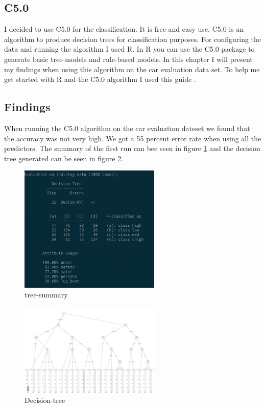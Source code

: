 \documentclass[a4paper, 12pt]{article}
\begin{document}
\subsection{C5.0}
I decided to use C5.0 for the classification. It is free and easy use. C5.0 is an algorithm to produce decision trees for classification purposes. For configuring the data and running the algorithm I used R. In R you can use the C5.0 package to generate basic tree-models and rule-based models. In this chapter I will present my findings when using this algorithm on the car evaluation data set. To help me get started with R and the C5.0 algorithm I used this guide \cite{guide}.

\subsection{Findings}
When running the C5.0 algorithm on the car evaluation dateset we found that the accuracy was not very high. We got a 55 percent error rate when using all the predictors. The summary of the first run can bee seen in figure \ref{fig:tree-summary} and the decision tree generated can be seen in figure \ref{fig:decition-tree}.
  \begin{figure}[h]
    \centering 
    \includegraphics[width=0.6\textwidth]
    {images/summary}
    \caption{tree-summary}
    \label{fig:tree-summary}
  \end{figure}

  \begin{figure}[h]
    \centering 
    \includegraphics[width=0.6\textwidth]
    {images/tree}
    \caption{Decision-tree}
    \label{fig:decition-tree}
  \end{figure}
\end{document}
